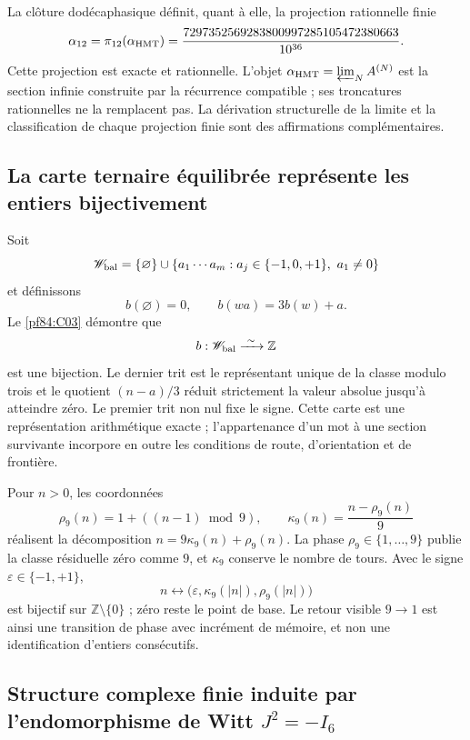 La clôture dodécaphasique définit, quant à elle, la projection rationnelle finie
\begin{equation}
 \alpha_{12}=\pi_{12}(\alpha_{\rm HMT})
 =\frac{7297352569283800997285105472380663}{10^{36}}.
 \label{p3-83-c44-s1:eq:alpha-racional-taxonomia-rev11}
\end{equation}
Cette projection est exacte et rationnelle. L'objet
\(\alpha_{\rm HMT}=\varprojlim_NA^{(N)}\) est la section infinie construite
par la récurrence compatible ; ses troncatures rationnelles ne la remplacent pas.
La dérivation structurelle de la limite et la classification de chaque
projection finie sont des affirmations complémentaires.

\subsection{La carte ternaire équilibrée représente les entiers
bijectivement}

Soit
\[
 \mathscr W_{\rm bal}
 =\{\varnothing\}\cup
 \{a_1\cdots a_m:
 a_j\in\{-1,0,+1\},\ a_1\neq0\}
\]
et définissons
\[
 b(\varnothing)=0,
 \qquad
 b(wa)=3b(w)+a.
\]
Le \cref{pf84:C03} démontre que
\begin{equation}
 b:\mathscr W_{\rm bal}\xrightarrow{\ \sim\ }\mathbb Z
 \label{p3-83-c44-s1:eq:carta-entera-balanceada-rev11}
\end{equation}
est une bijection. Le dernier trit est le représentant unique de la
classe modulo trois et le quotient \((n-a)/3\) réduit strictement la valeur
absolue jusqu'à atteindre zéro. Le premier trit non nul fixe le signe. Cette carte
est une représentation arithmétique exacte ; l'appartenance d'un mot à une
section survivante incorpore en outre les conditions de route,
d'orientation et de frontière.

Pour \(n>0\), les coordonnées
\[
 \rho_9(n)=1+((n-1)\bmod9),
 \qquad
 \kappa_9(n)=\frac{n-\rho_9(n)}9
\]
réalisent la décomposition \(n=9\kappa_9(n)+\rho_9(n)\). La phase
\(\rho_9\in\{1,\ldots,9\}\) publie la classe résiduelle zéro comme \(9\), et
\(\kappa_9\) conserve le nombre de tours. Avec le signe
\(\varepsilon\in\{-1,+1\}\),
\[
 n\longleftrightarrow
 \bigl(\varepsilon,\kappa_9(|n|),\rho_9(|n|)\bigr)
\]
est bijectif sur \(\mathbb Z\setminus\{0\}\) ; zéro reste le point
de base. Le retour visible \(9\to1\) est ainsi une transition de phase avec
incrément de mémoire, et non une identification d'entiers consécutifs.

\subsection{Structure complexe finie induite par l'endomorphisme de Witt \texorpdfstring{\(J^2=-I_6\)}{J²=-I₆}}


